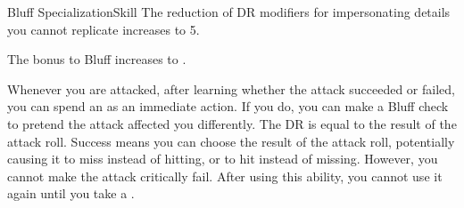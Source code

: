 \begin{feat}{Bluff Specialization}{Skill}
         The reduction of DR modifiers for impersonating details you cannot replicate increases to 5.

         The bonus to Bluff increases to .

         Whenever you are attacked, after learning whether the attack succeeded or failed, you can spend an  as an immediate action.
        If you do, you can make a Bluff check to pretend the attack affected you differently.
        The DR is equal to the result of the attack roll.
        Success means you can choose the result of the attack roll, potentially causing it to miss instead of hitting, or to hit instead of missing.
        However, you cannot make the attack critically fail.
        After using this ability, you cannot use it again until you take a .
    \end{feat}

